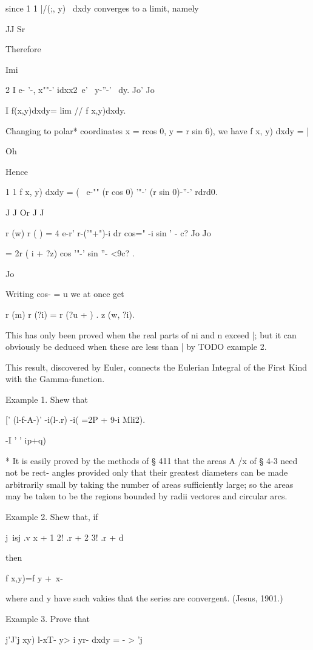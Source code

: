since 1 1 |/(;, y) \ dxdy converges to a limit, namely

JJ Sr

Therefore

Imi

2 I e- '-, x""-' idxx2\ e' \ y-''-' \ dy. Jo' Jo

I f(x,y)dxdy= lim // f x,y)dxdy.

Changing to polar* coordinates x = rcos 0, y = r sin 6), we have f x,
y) dxdy = |

Oh

Hence

1 1 f x, y) dxdy = ( \ e-"" (r cos 0) '"-' (r sin 0)-''-' rdrd0.

J J Or J J

r (w) r ( ) = 4 e-r' r-('"+")-i dr cos=" -i sin ' - c? Jo Jo

= 2r ( i + ?z) cos '"-' sin ''- <9c? .

Jo

Writing cos- = u we at once get

r (m) r (?i) = r (?u + ) . z (w, ?i).

This has only been proved when the real parts of ni and n exceed |;
but it can obviously be deduced when these are less than | by TODO
example 2.

This result, discovered by Euler, connects the Eulerian Integral of
the First Kind with the Gamma-function.

Example 1. Shew that

[' (l-f-A-)' -i(l-.r) -i( =2P + 9-i Mli2).

  -I ' ' ip+q)

* It is easily proved by the methods of § 411 that the areas A /x of §
4-3 need not be rect- angles provided only that their greatest
diameters can be made arbitrarily small by taking the number of areas
sufficiently large; so the areas may be taken to be the regions
bounded by radii vectores and circular arcs.

%
%

Example 2. Shew that, if

j\ isj .v x + 1 2! .r + 2 3! .r + d

then

f x,y)=f y + \,x-\ \

where and y have such vakies that the series are convergent. (Jesus,
1901.)

Example 3. Prove that

j'J'j xy) l-xT- y> i yr- dxdy = - > 'j

